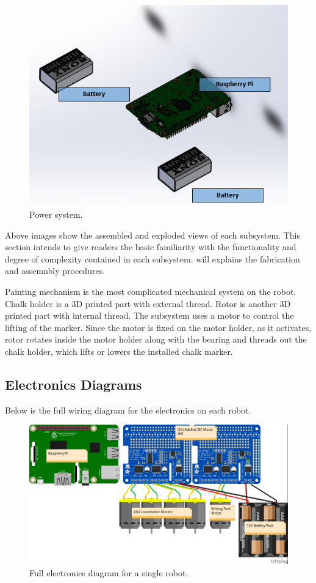 \begin{figure}[h!]
\centering
\includegraphics[width=0.6\columnwidth]{hardware/CAD/PowerSystem/Power.PNG}
\caption{Power system.}
\label{fig:power-diagram}
\end{figure}

Above images show the assembled and exploded views of each subsystem. This section intends to give readers the basic familiarity with the functionality and degree of complexity contained in each subsystem.  will explains the fabrication and assemnbly procedures.

Painting mechanism is the most complicated mechanical system on the robot. Chalk holder is a 3D printed part with external thread. Rotor is another 3D printed part with internal thread. The subsystem uses a motor to control the lifting of the marker. Since the motor is fixed on the motor holder, as it activates, rotor rotates inside the motor holder along with the bearing and threads out the chalk holder, which lifts or lowers the installed chalk marker.

\clearpage

\subsection{Electronics Diagrams}
\label{sec:electronics_diagrams}

Below is the full wiring diagram for the electronics on each robot. 

\begin{figure}
\centering
\includegraphics[width=0.9\columnwidth]{figs/wiring-diagram.jpg}
\caption{Full electronics diagram for a single robot.}
\label{fig:electronics-diagram}
\end{figure}

